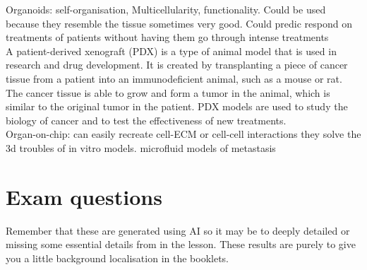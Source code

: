 \documentclass{article}
\begin{document}
Organoids: self-organisation, Multicellularity, functionality. Could be used because they resemble the tissue sometimes very good. Could predic respond on treatments of patients without having them go through intense treatments\\

A patient-derived xenograft (PDX) is a type of animal model that is used in research and drug development. It is created by transplanting a piece of cancer tissue from a patient into an immunodeficient animal, such as a mouse or rat. The cancer tissue is able to grow and form a tumor in the animal, which is similar to the original tumor in the patient. PDX models are used to study the biology of cancer and to test the effectiveness of new treatments.\\

Organ-on-chip: can easily recreate cell-ECM or cell-cell interactions they solve the 3d troubles of in vitro models. microfluid models of metastasis
\pagebreak
\section{Exam questions}
Remember that these are generated using AI so it may be to deeply detailed or missing some essential details from in the lesson. These results are purely to give you a little background localisation in the booklets.
\end{document}
